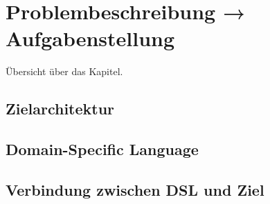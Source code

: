 \chapter{Problembeschreibung → Aufgabenstellung}

Übersicht über das Kapitel.

\section{Zielarchitektur}

\section{Domain-Specific Language}

\section{Verbindung zwischen DSL und Ziel}


